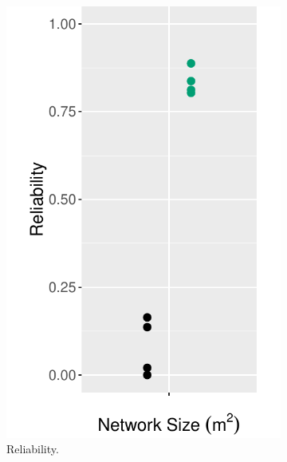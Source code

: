 \begin{figure}[bt]
\begin{subfigure}{0.32\textwidth}
        \includegraphics[width=\textwidth, keepaspectratio]{figure/Results/ChaosComparison/Flocklab/FlocklabComparison_Reliability.pdf}
        \caption{Reliability.}
        \label{subfig:flocklab-reliability}
    \end{subfigure}
    \begin{subfigure}{0.32\textwidth}
        \centering

\end{subfigure}
\end{figure}
